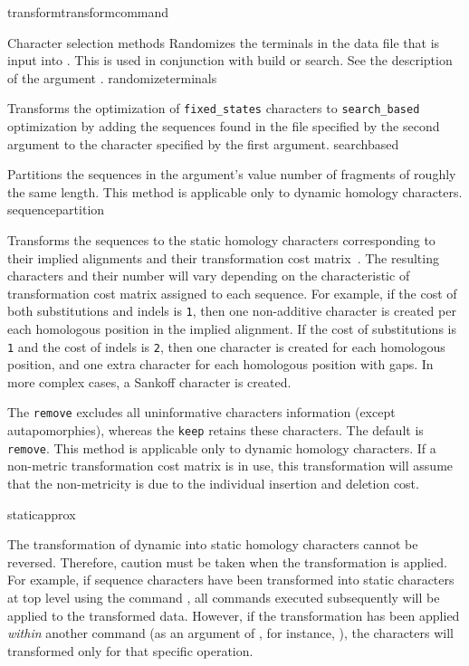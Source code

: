 \begin{command}{transform}{transformcommand}
\begin{arguments}
\begin{argumentgroup}{Character selection methods}
{Randomizes the terminals in the data file that is input into \poy. This is used in conjunction with 
build or search. See the description of the argument .}
{randomizeterminals}

{Transforms the optimization of \texttt{fixed\_states} characters to \texttt{search\_based}
optimization \cite{wheeler2003b} by adding the sequences found in the file specified by the second 
argument to the character specified by the first argument.}
{searchbased}

{Partitions the sequences in the argument's value number of
fragments of roughly the same length. This method is applicable only to dynamic homology characters.}
{sequencepartition}

{Transforms the sequences to the static homology characters
corresponding to their implied alignments and their transformation
cost matrix~\cite{wheeler2003}. The resulting characters and their number will vary
depending on the characteristic of transformation cost matrix
assigned to each sequence. For example, if the cost of both substitutions
and indels is \texttt{1}, then one non-additive character is created per
each homologous position in the implied alignment. If the cost of
substitutions is \texttt{1} and the cost of indels is \texttt{2}, then
one character is created for each homologous position, and one extra character for
each homologous position with gaps. In more complex cases, a Sankoff character is
created. %

\setlength{\parindent}{0.5cm}                
\indent 
The \poylident \texttt{remove} excludes all uninformative characters
information (except autapomorphies), whereas the \poylident \texttt{keep}
retains these characters. The default is \texttt{remove}. This
method is applicable only to dynamic homology characters. If
a non-metric transformation cost matrix is in use, this
transformation will assume that the non-metricity is due to the
individual insertion and deletion cost.}
{staticapprox}

\begin{statement}
The transformation of dynamic into static homology characters cannot be reversed.
Therefore, caution must be taken when the transformation is applied. For example,
if sequence characters have been transformed into static characters at top level using
the command , all commands executed 
subsequently will be applied to the transformed data. However, if the transformation has 
been applied \emph{within} another command (as an argument of , 
for instance, ), the characters will 
transformed only for that specific operation.
\end{statement}


\end{argumentgroup}
\end{arguments}
\end{command}
